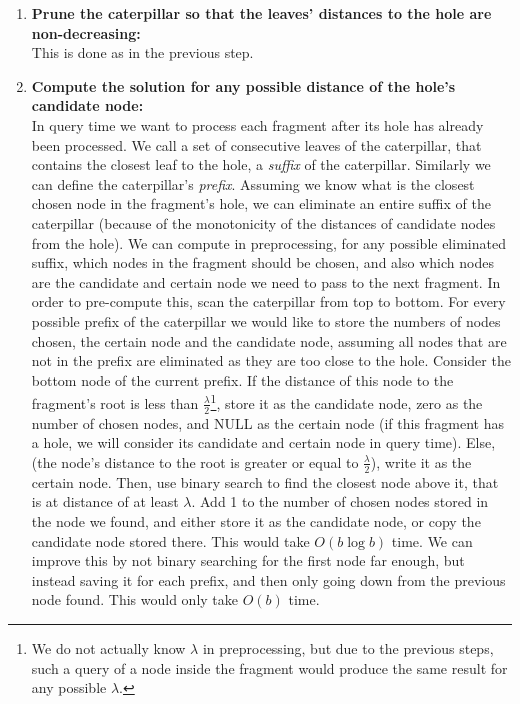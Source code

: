 \documentclass[11pt,a4paper]{article}
\theoremstyle{definition}
\theoremstyle{remark}
\begin{document}
\begin{enumerate}
\item \label{making distances from the hole monotone}
\textbf{Prune the caterpillar so that the leaves' distances to the hole are non-decreasing:}\\
This is done as in the previous step.
\item\textbf{Compute the solution for any possible distance of the hole's candidate node:}\\
In query time we want to process each fragment after its hole has already been processed.
We call a set of consecutive leaves of the caterpillar, that contains the closest leaf to the hole, a \emph{suffix} of the caterpillar. Similarly we can define the caterpillar's \emph{prefix}.
Assuming we know what is the closest chosen node in the fragment's hole, we can eliminate an entire suffix of the caterpillar (because of the monotonicity of the distances of candidate nodes from the hole). We can compute in preprocessing, for any possible eliminated suffix, which nodes in the fragment should be chosen, and also which nodes are the candidate and certain node we need to pass to the next fragment.
In order to pre-compute this, scan the caterpillar from top to bottom. For every possible prefix of the caterpillar we would like to store the numbers of nodes chosen, the certain node and the candidate node, assuming all nodes that are not in the prefix are eliminated as they are too close to the hole. Consider the bottom node of the current prefix. If the distance of this node to the fragment's root is less than $\frac{\lambda}{2}$\footnote{We do not actually know $\lambda$ in preprocessing, but due to the previous steps, such a query of a node inside the fragment would produce the same result for any possible $\lambda$.}, store it as the candidate node, zero as the number of chosen nodes, and NULL as the certain node (if this fragment has a hole, we will consider its candidate and certain node in query time). Else, (the node's distance to the root is greater or equal to $\frac{\lambda}{2}$), write it as the certain node. Then, use binary search to find the closest node above it, that is at distance of at least $\lambda$. Add 1 to the number of chosen nodes stored in the node we found, and either store it as the candidate node, or copy the candidate node stored there. This would take $O(b \log b)$ time. We can improve this by not binary searching for the first node far enough, but instead saving it for each prefix, and then only going down from the previous node found. This would only take $O(b)$ time.
\end{enumerate}
\end{document}
